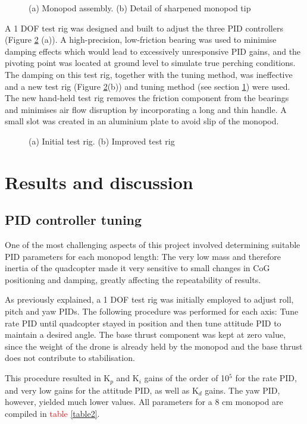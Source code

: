 \documentclass[12pt,a4paper]{article}
\begin{document}
\begin{figure}[h!]
\centering
  \caption{(a) Monopod assembly. (b) Detail of sharpened monopod tip}
  \label{fig5}
\end{figure}

A 1 DOF test rig was designed and built to adjust the three PID controllers (Figure \ref{fig6} (a)). A high-precision, low-friction bearing was used to minimise damping effects which would lead to excessively unresponsive PID gains, and the pivoting point was located at ground level to simulate true perching conditions. The damping on this test rig, together with the tuning method, was ineffective and a new test rig (Figure \ref{fig6}(b)) and tuning method (see section \ref{Results and discussion}) were used. The new hand-held test rig removes the friction component from the bearings and minimises air flow disruption by incorporating a long and thin handle. A small slot was created in an aluminium plate to avoid slip of the monopod.


\begin{figure}[h!]
\centering
  \caption{(a) Initial test rig. (b) Improved test rig}
  \label{fig6}
\end{figure}

\section{Results and discussion} \label{Results and discussion}
\subsection{PID controller tuning}
One of the most challenging aspects of this project involved determining suitable PID parameters for each monopod length: The very low mass and therefore inertia of the quadcopter made it very sensitive to small changes in CoG positioning and damping, greatly affecting the repeatability of results.

As previously explained, a 1 DOF test rig was initially employed to adjust roll, pitch and yaw PIDs. The following procedure was performed for each axis: Tune rate PID until quadcopter stayed in position and then tune attitude PID to maintain a desired angle. The base thrust component was kept at zero value, since the weight of the drone is already held by the monopod and the base thrust does not contribute to stabilisation.

This procedure resulted in K$_p$ and K$_i$ gains of the order of 10$^5$ for the rate PID, and very low gains for the attitude PID, as well as K$_d$ gains. The yaw PID, however, yielded much lower values. All parameters for a 8 cm monopod are compiled in \textcolor{red}{table \ref{table2}}. 
\end{document}
